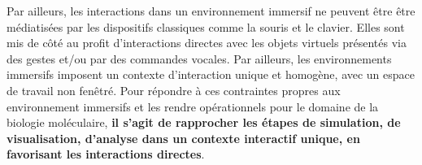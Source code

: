 Par ailleurs, les interactions dans un environnement immersif ne peuvent être être médiatisées par les dispositifs classiques comme la souris et le clavier. Elles sont mis de côté au profit d'interactions directes avec les objets virtuels présentés via des gestes et/ou par des commandes vocales. Par ailleurs, les environnements immersifs imposent un contexte d'interaction unique et homogène, avec un espace de travail non fenêtré. Pour répondre à ces contraintes propres aux environnement immersifs et les rendre opérationnels pour le domaine de la biologie moléculaire, \textbf{il s'agit de rapprocher les étapes de simulation, de visualisation, d'analyse dans un contexte interactif unique, en favorisant les interactions directes}.






